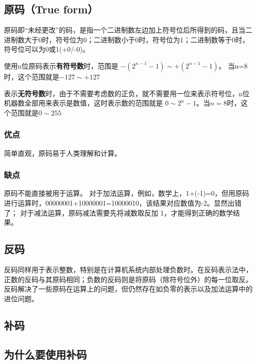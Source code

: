 \begin{issues}
\issueDraft
\end{issues}


\subsection{原码（True form）}

原码即“未经更改”的码，是指一个二进制数左边加上符号位后所得到的码，且当二进制数大于0时，符号位为0；二进制数小于0时，符号位为1；二进制数等于0时，符号位可以为0或1(+0/-0)。

使用n位原码表示\textbf{有符号数}时，范围是 $-(2^{n-1}-1)\sim +(2^{n-1}-1)$。 当n=8时，这个范围就是$-127\sim +127 $

表示\textbf{无符号数}时，由于不需要考虑数的正负，就不需要用一位来表示符号位，n位机器数全部用来表示是数值，这时表示数的范围就是
$0\sim 2^{n}-1$。当$n=8$时，这个范围就是$0\sim 255$

\subsubsection{优点}

简单直观，原码易于人类理解和计算。

\subsubsection{缺点}
原码不能直接被用于运算。
对于加法运算，例如，数学上，1+(-1)=0，但用原码进行运算时，00000001+10000001=10000010，该结果对应数值为-2。显然出错了；
对于减法运算，原码减法需要先将减数取反加 1，才能得到正确的数学结果。


\subsection{反码}

反码同样用于表示整数，特别是在计算机系统内部处理负数时。在反码表示法中，正数的反码与其原码相同；负数的反码则是将原码（除符号位外）的每一位取反。反码解决了一些原码在运算上的问题，但仍然存在如负零的表示以及加法运算中的进位问题。

\subsection{补码}

\subsection{为什么要使用补码}

